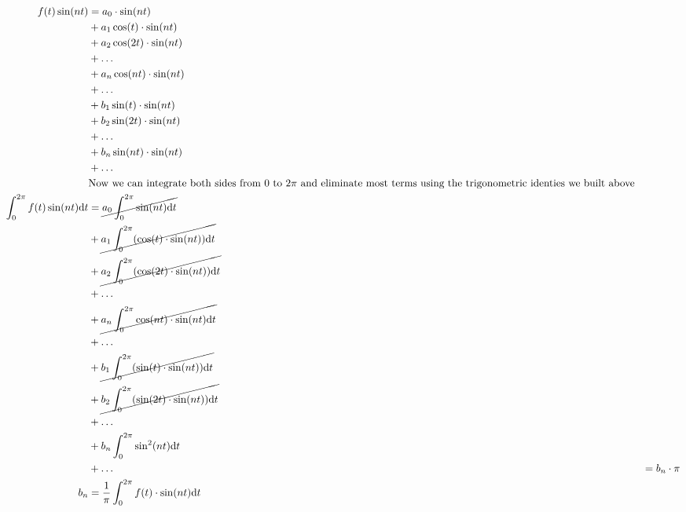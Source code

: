 \documentclass[10pt]{article} %
\begin{document}
\begin{align}
    f(t)\sin(nt) & = a_0 \cdot \sin(nt) \\& + a_1\cos(t) \cdot \sin(nt) \\& + a_2\cos(2t) \cdot \sin(nt) \\& + \dots \\& + a_n\cos(nt) \cdot \sin(nt) \\& + \dots \\& + b_1\sin(t) \cdot \sin(nt) \\& + b_2\sin(2t) \cdot \sin(nt) \\& + \dots \\& + b_n\sin(nt) \cdot \sin(nt) \\& + \dots \\
    &\text{Now we can integrate both sides from $0$ to $2\pi$ and eliminate most terms using the trigonometric identies we built above}\\
    \int_0^{2\pi}f(t)\sin(nt)\mathrm{d}t & = \cancel{a_0 \int_0^{2\pi} \sin(nt) \mathrm{d}t} \\& + \cancel{a_1\int_0^{2\pi}(\cos(t) \cdot \sin(nt)) \mathrm{d}t} \\& + \cancel{a_2\int_0^{2\pi}(\cos(2t) \cdot \sin(nt)) \mathrm{d}t} \\& + \dots \\& + \cancel{a_n\int_0^{2\pi} \cos(nt) \cdot \sin(nt) \mathrm{d}t} \\& + \dots \\& + \cancel{b_1\int_0^{2\pi}(\sin(t) \cdot \sin(nt)) \mathrm{d}t} \\& + \cancel{b_2\int_0^{2\pi}(\sin(2t) \cdot \sin(nt)) \mathrm{d}t} \\& + \dots \\& + b_n\int_0^{2\pi}\sin^2(nt) \mathrm{d}t \\& + \dots
    & = b_n \cdot \pi \\
    b_n & = \frac1\pi \int_0^{2\pi}f(t) \cdot \sin(nt) \mathrm{d}t
\end{align}
\end{document}
